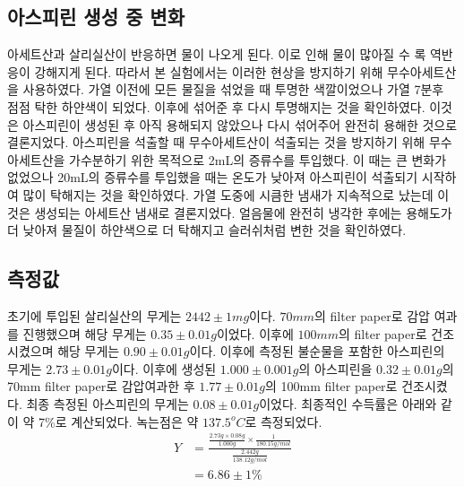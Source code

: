 \documentclass[%
 reprint,
 amsmath,amssymb,
 aps,
]{revtex4-2}
\begin{document}
\subsection{\label{sec:level2}아스피린 생성 중 변화}
아세트산과 살리실산이 반응하면 물이 나오게 된다. 이로 인해 물이 많아질 수 록 역반응이 강해지게 된다. 따라서 본 실험에서는 이러한 현상을 방지하기 위해 무수아세트산을 사용하였다. 가열 이전에 모든 물질을 섞었을 때 투명한 색깔이었으나 가열 7분후 점점 탁한 하얀색이 되었다. 이후에 섞어준 후 다시 투명해지는 것을 확인하였다. 이것은 아스피린이 생성된 후 아직 용해되지 않았으나 다시 섞어주어 완전히 용해한 것으로 결론지었다. 아스피린을 석출할 때 무수아세트산이 석출되는 것을 방지하기 위해 무수아세트산을 가수분하기 위한 목적으로 2mL의 증류수를 투입했다. 이 때는 큰 변화가 없었으나 20mL의 증류수를 투입했을 때는 온도가 낮아져 아스피린이 석출되기 시작하여 많이 탁해지는 것을 확인하였다. 가열 도중에 시큼한 냄새가 지속적으로 났는데 이것은 생성되는 아세트산 냄새로 결론지었다. 얼음물에 완전히 냉각한 후에는 용해도가 더 낮아져 물질이 하얀색으로 더 탁해지고 슬러쉬처럼 변한 것을 확인하였다.

\subsection{\label{sec:level2}측정값}
초기에 투입된 살리실산의 무게는 $2442\pm 1mg$이다. $70mm$의 filter paper로 감압 여과를 진행했으며 해당 무게는 $0.35\pm 0.01g$이었다. 이후에 $100mm$의 filter paper로 건조시켰으며 해당 무게는 $0.90\pm 0.01g$이다. 이후에 측정된 불순물을 포함한 아스피린의 무게는 $2.73 \pm  0.01 g$이다. 이후에 생성된 $1.000 \pm 0.001g$의 아스피린을 $0.32\pm 0.01g$의 70mm filter paper로 감압여과한 후 $1.77\pm 0.01g$의 100mm filter paper로 건조시켰다. 최종 측정된 아스피린의 무게는 $0.08\pm 0.01g$이었다. 최종적인 수득률은 아래와 같이 약 7\%로 계산되었다. 녹는점은 약 $137.5^{o}C$로 측정되었다.
\begin{align}
	Y &= \frac{\frac{2.73g \times 0.08 g}{1.000g} \times \frac{1}{180.15g/mol}}{\frac{2.442g}{138.12g/mol}}\\
	&= 6.86\pm 1\%
\end{align}
\end{document}
